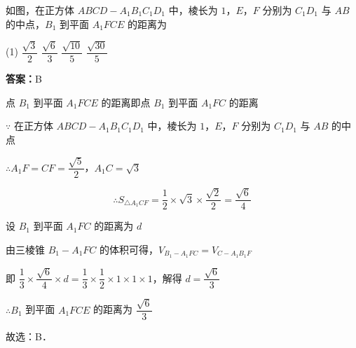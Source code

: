 \vspace{2em}


\begin{example}[\bkstar{2}{5}]
如图，在正方体 $ABCD-A_1B_1C_1D_1$ 中，棱长为 $1$，$E$，$F$ 分别为 $C_1D_1$ 与 $AB$ 的中点，$B_1$ 到平面 $A_1FCE$ 的距离为
\begin{tasks}(1)
    \task $\dfrac{\sqrt{3}}{2}$
    \task $\dfrac{\sqrt{6}}{3}$
    \task $\dfrac{\sqrt{10}}{5}$
    \task $\dfrac{\sqrt{30}}{5}$
\end{tasks}
\end{example}
\begin{solution}
\textbf{答案：}B

点 $B_1$ 到平面 $A_1FCE$ 的距离即点 $B_1$ 到平面 $A_1FC$ 的距离

$\because$ 在正方体 $ABCD-A_1B_1C_1D_1$ 中，棱长为 $1$，$E$，$F$ 分别为 $C_1D_1$ 与 $AB$ 的中点

$\therefore A_1F=CF=\dfrac{\sqrt{5}}{2}$，$A_1C=\sqrt{3}$

$$
\therefore S_{\triangle A_1CF}=\dfrac{1}{2}\times\sqrt{3}\times\dfrac{\sqrt{2}}{2}=\dfrac{\sqrt{6}}{4}
$$

设 $B_1$ 到平面 $A_1FC$ 的距离为 $d$

由三棱锥 $B_1-A_1FC$ 的体积可得，$V_{B_1-A_1FC}=V_{C-A_1B_1F}$

即 $\dfrac{1}{3}\times\dfrac{\sqrt{6}}{4}\times d=\dfrac{1}{3}\times\dfrac{1}{2}\times 1\times 1\times 1$，解得 $d=\dfrac{\sqrt{6}}{3}$

$\therefore B_1$ 到平面 $A_1FCE$ 的距离为 $\dfrac{\sqrt{6}}{3}$

故选：B．
\end{solution}

\vspace{2em}

